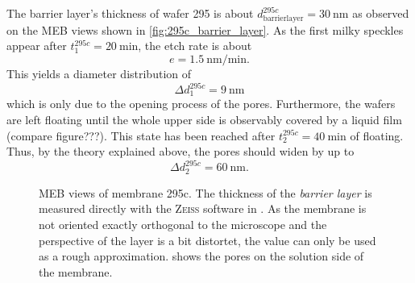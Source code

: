 \documentclass[thesis.tex]{subfiles}
\begin{document}
      The barrier layer's thickness of wafer 295 is about $d_\mathrm{barrierlayer}^{295c}=\SI{30}{\nano\meter} $ as observed on the MEB views shown in \cref{fig:295c_barrier_layer}. As the first milky speckles appear after $t_1^{295c}=\SI{20}{\minute} $, the etch rate is about
      \begin{equation}
          e = \SI{1,5}{\nano\meter\per\minute}. \label{eq:etch-rate}
      \end{equation}
      This yields a diameter distribution of
      \begin{equation}
          \Delta d_1^{295c} = \SI{9}{\nano\meter}
      \end{equation}
      which is only due to the opening process of the pores. Furthermore, the wafers are left floating until the whole upper side is observably covered by a liquid film (compare figure???). This state has been reached after $t_\mathrm{2}^{295c}=\SI{40}{\minute} $ of floating. Thus, by the theory explained above, the pores should widen by up to
      \begin{equation}
          \Delta d_2^{295c} =\SI{60}{\nano\meter}.
      \end{equation}
      \medskip

      \begin{figure}
        \hfill
        \caption{MEB views of membrane 295c. The thickness of the \textit{barrier layer} is measured directly with the \textsc{Zeiss} software in \protect{}. As the membrane is not oriented exactly orthogonal to the microscope and the perspective of the layer is a bit distortet, the value can only be used as a rough approximation. \protect{} shows the pores on the solution side of the membrane.}
      \end{figure}
\end{document}
